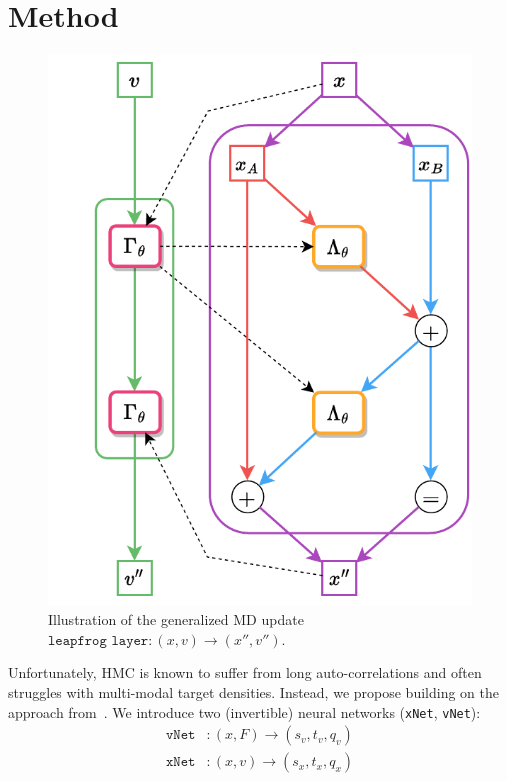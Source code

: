 \documentclass[a4paper,11pt]{article}
\begin{document}
\section{\label{sec:method}Method}
%
\begin{figure}
  \begin{center}
    \includegraphics[width=\linewidth]{assets/leapfrog-layer-alt-2.pdf}
  \end{center}
    \caption{\label{fig:lf-layer}Illustration of the generalized MD update $\texttt{leapfrog layer}: (x, v) \rightarrow (x'', v'')$.}
\end{figure}
%
Unfortunately, HMC is known to suffer from long auto-correlations and often struggles with multi-modal target densities.
%
Instead, we propose building on the approach from~\cite{L2HMC,FTHMC,etc}. We introduce two (invertible) neural networks (\texttt{xNet}, \texttt{vNet}):
%
\begin{align}
\texttt{vNet}&: (x, F) \rightarrow (s_{v}, t_{v}, q_{v}) \\
\texttt{xNet}&: (x, v) \rightarrow (s_{x}, t_{x}, q_{x})
\end{align}
\end{document}
